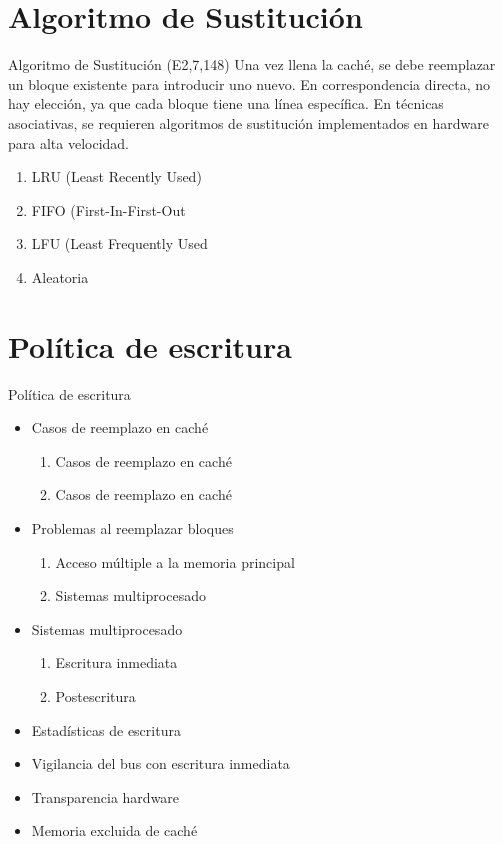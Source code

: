 \documentclass[presentation]{beamer}
\begin{document}
\section{Algoritmo de Sustitución}
\label{sec:orgd459187}
\begin{frame}[allowframebreaks]{Algoritmo de Sustitución (E2,7,148)}
Una vez llena la caché, se debe reemplazar un bloque existente para introducir uno nuevo.
En correspondencia directa, no hay elección, ya que cada bloque tiene una línea específica.
En técnicas asociativas, se requieren algoritmos de sustitución implementados en hardware para alta velocidad.\autocite{stallings2006organización}
\begin{enumerate}
\item LRU (Least Recently Used)
\item FIFO (First-In-First-Out
\item LFU (Least Frequently Used
\item Aleatoria
\end{enumerate}
\end{frame}

\section{Política de escritura}
\label{sec:org4b31c5e}
\begin{frame}[allowframebreaks]{Política de escritura}
\begin{itemize}
\item Casos de reemplazo en caché
\begin{enumerate}
\item Casos de reemplazo en caché
\item Casos de reemplazo en caché
\end{enumerate}
\item Problemas al reemplazar bloques
\begin{enumerate}
\item Acceso múltiple a la memoria principal
\item Sistemas multiprocesado
\end{enumerate}
\item Sistemas multiprocesado
\begin{enumerate}
\item Escritura inmediata
\item Postescritura
\end{enumerate}
\item Estadísticas de escritura
\item Vigilancia del bus con escritura inmediata
\item Transparencia hardware
\item Memoria excluida de caché
\end{itemize}
\end{frame}
\end{document}
